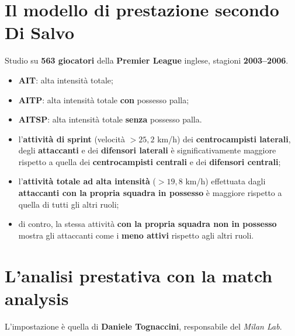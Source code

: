 \section{Il modello di prestazione secondo Di Salvo}

Studio su \textbf{563 giocatori} della \textbf{Premier League} inglese, stagioni
\textbf{2003--2006}.

\begin{itemize}
  \item \textbf{AIT}: alta intensità totale;
  \item \textbf{AITP}: alta intensità totale \textbf{con} possesso palla;
  \item \textbf{AITSP}: alta intensità totale \textbf{senza} possesso palla.
\end{itemize}

\begin{itemize}
  \item l'\textbf{attività di sprint} (velocità $> 25,2$ km/h) dei \textbf{centrocampisti
    laterali}, degli \textbf{attaccanti} e dei \textbf{difensori laterali} è significativamente
    maggiore rispetto a quella dei \textbf{centrocampisti centrali} e dei \textbf{difensori
    centrali};
  \item l'\textbf{attività totale ad alta intensità} ($> 19,8$ km/h) effettuata dagli
    \textbf{attaccanti con la propria squadra in possesso} è maggiore rispetto a quella di tutti
    gli altri ruoli;
  \item di contro, la stessa attività \textbf{con la propria squadra non in possesso} mostra gli
    attaccanti come i \textbf{meno attivi} rispetto agli altri ruoli.
\end{itemize}

\section{L'analisi prestativa con la match analysis}

L'impostazione è quella di \textbf{Daniele Tognaccini}, responsabile del \textit{Milan Lab}.

